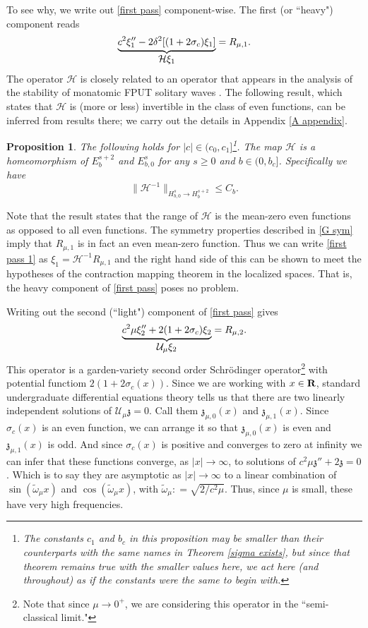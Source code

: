 \documentclass[12pt]{amsart}
\makeatletter
\numberwithin{equation}{section}
\newtheorem{proposition}[theorem]{Proposition}
\newcommand{\ds}{\displaystyle}
\newcommand{\be}{\begin{equation}}
\newcommand{\ee}{\end{equation}}
\newcommand{\R}{{\bf{R}}}
\newcommand{\jb}{{{\bf{e}}_2}}
\newcommand{\ib}{{{\bf{e}}_1}}
\newcommand{\muz}{{\mu,0}}
\newcommand{\muo}{{\mu,1}}
\renewcommand{\H}{{\mathcal{H}}}
\newcommand{\U}{{\mathcal{U}}}
\newcommand{\bunderbrace}[2]{%
  \begin{array}[t]{@{}c@{}}
  \underbrace{#1}\\
  #2
  \end{array}
}
\renewcommand{\tilde}{\widetilde}
\makeatother
\begin{document}
To see why, we write out \eqref{first pass} component-wise. The  first (or ``heavy") component reads
\be\label{first pass 1}\begin{split}
\bunderbrace{c^2 \xi_1'' - 2 \delta^2[(1+2\sigma_c) \xi_1]}{\H \xi_1} = R_{\mu,1}.%
\end{split}\ee
The operator $\H$ is closely related to an operator that appears in the analysis of the  stability of monatomic FPUT solitary waves \cite{friesecke-pego1}.
The following result, which states that $\H$ is (more or less) invertible in the class of even functions, can be inferred from results there; we 
carry out the details in Appendix \ref{A appendix}.
\begin{proposition}\label{A props} 
The following holds for
$|c| \in (c_0,c_1]$\footnote{The constants $c_1$ and $b_c$ in this proposition may be smaller
than their counterparts with the same names in Theorem \ref{sigma exists}, but since that theorem remains
true with the smaller values here, we act here (and throughout) as if the constants were the same to begin with.}. The map $\H$ is a homeomorphism of $E^{s+2}_{b}$ and $E^s_{b,0}$ for any $s \ge 0$ and $b \in (0,b_c]$. Specifically we have
\be\label{A estimate}
\| \H^{-1}  \|_{H^{s}_{b,0} \to H^{s+2}_b} \le C_b. 
\ee
\end{proposition}
Note that the result states that the range of $\H$ is the mean-zero even functions as opposed to all even functions.
The symmetry properties described in \eqref{G sym} imply that $R_{\mu,1}$ is in fact an even mean-zero function.
Thus we can write \eqref{first pass 1} as $\xi_1 = \H^{-1} R_{\mu,1}$ and the right hand side of this can be shown
to meet the hypotheses of the contraction mapping theorem in the localized spaces. That is, the heavy component of \eqref{first pass}
poses no problem.

Writing out the second (``light") component of \eqref{first pass} gives
\be\label{first pass 2}
\bunderbrace{c^2 \mu \xi_2'' + 2(1 + 2\sigma_c) \xi_2}{\U_\mu \xi_2} = R_{\mu,2}.%
\ee
This operator is a garden-variety second order Schr\"odinger operator\footnote{Note that since  $\mu \to 0^+$, 
we are considering this operator in the ``semi-classical limit."} with potential functiom $2(1 + 2\sigma_c(x))$.
Since we are working with $x \in \R$, standard undergraduate differential equations theory tells us that there are two linearly
independent solutions of $\U_\mu \mathfrak{z} = 0$. Call them $\mathfrak{z}_\muz(x)$ and $\mathfrak{z}_\muo(x)$. 
Since $\sigma_c(x)$ is an even function, we can arrange it so that $\mathfrak{z}_\muz(x)$ is even and $\mathfrak{z}_\muo(x)$
is odd.
And since $\sigma_c(x)$ is positive and converges to zero at infinity 
we can infer that these functions converge, as $|x| \to \infty$, to solutions of $c^2\mu \mathfrak{z}'' + 2 \mathfrak{z}= 0$. Which is
to say they are asymptotic as $|x| \to \infty$ to a linear combination of $\sin(\tilde{\omega}_\mu x)$ and $\cos(\tilde{\omega}_\mu x)$, with $\tilde{\omega}_\mu : = \ds \sqrt{2 /c^2 \mu}$.
Thus, since $\mu$ is small, these have very high frequencies.
\end{document}
